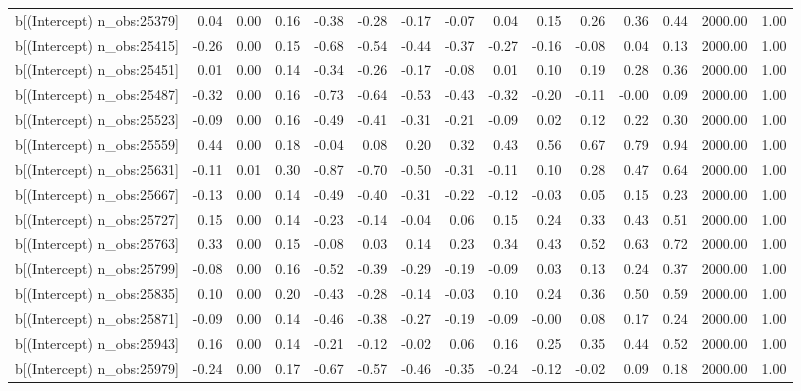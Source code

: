 \begin{table}[ht]
\begin{tabular}{rrrrrrrrrrrrrrr}
  b[(Intercept) n\_obs:25379] & 0.04 & 0.00 & 0.16 & -0.38 & -0.28 & -0.17 & -0.07 & 0.04 & 0.15 & 0.26 & 0.36 & 0.44 & 2000.00 & 1.00 \\ 
  b[(Intercept) n\_obs:25415] & -0.26 & 0.00 & 0.15 & -0.68 & -0.54 & -0.44 & -0.37 & -0.27 & -0.16 & -0.08 & 0.04 & 0.13 & 2000.00 & 1.00 \\ 
  b[(Intercept) n\_obs:25451] & 0.01 & 0.00 & 0.14 & -0.34 & -0.26 & -0.17 & -0.08 & 0.01 & 0.10 & 0.19 & 0.28 & 0.36 & 2000.00 & 1.00 \\ 
  b[(Intercept) n\_obs:25487] & -0.32 & 0.00 & 0.16 & -0.73 & -0.64 & -0.53 & -0.43 & -0.32 & -0.20 & -0.11 & -0.00 & 0.09 & 2000.00 & 1.00 \\ 
  b[(Intercept) n\_obs:25523] & -0.09 & 0.00 & 0.16 & -0.49 & -0.41 & -0.31 & -0.21 & -0.09 & 0.02 & 0.12 & 0.22 & 0.30 & 2000.00 & 1.00 \\ 
  b[(Intercept) n\_obs:25559] & 0.44 & 0.00 & 0.18 & -0.04 & 0.08 & 0.20 & 0.32 & 0.43 & 0.56 & 0.67 & 0.79 & 0.94 & 2000.00 & 1.00 \\ 
  b[(Intercept) n\_obs:25631] & -0.11 & 0.01 & 0.30 & -0.87 & -0.70 & -0.50 & -0.31 & -0.11 & 0.10 & 0.28 & 0.47 & 0.64 & 2000.00 & 1.00 \\ 
  b[(Intercept) n\_obs:25667] & -0.13 & 0.00 & 0.14 & -0.49 & -0.40 & -0.31 & -0.22 & -0.12 & -0.03 & 0.05 & 0.15 & 0.23 & 2000.00 & 1.00 \\ 
  b[(Intercept) n\_obs:25727] & 0.15 & 0.00 & 0.14 & -0.23 & -0.14 & -0.04 & 0.06 & 0.15 & 0.24 & 0.33 & 0.43 & 0.51 & 2000.00 & 1.00 \\ 
  b[(Intercept) n\_obs:25763] & 0.33 & 0.00 & 0.15 & -0.08 & 0.03 & 0.14 & 0.23 & 0.34 & 0.43 & 0.52 & 0.63 & 0.72 & 2000.00 & 1.00 \\ 
  b[(Intercept) n\_obs:25799] & -0.08 & 0.00 & 0.16 & -0.52 & -0.39 & -0.29 & -0.19 & -0.09 & 0.03 & 0.13 & 0.24 & 0.37 & 2000.00 & 1.00 \\ 
  b[(Intercept) n\_obs:25835] & 0.10 & 0.00 & 0.20 & -0.43 & -0.28 & -0.14 & -0.03 & 0.10 & 0.24 & 0.36 & 0.50 & 0.59 & 2000.00 & 1.00 \\ 
  b[(Intercept) n\_obs:25871] & -0.09 & 0.00 & 0.14 & -0.46 & -0.38 & -0.27 & -0.19 & -0.09 & -0.00 & 0.08 & 0.17 & 0.24 & 2000.00 & 1.00 \\ 
  b[(Intercept) n\_obs:25943] & 0.16 & 0.00 & 0.14 & -0.21 & -0.12 & -0.02 & 0.06 & 0.16 & 0.25 & 0.35 & 0.44 & 0.52 & 2000.00 & 1.00 \\ 
  b[(Intercept) n\_obs:25979] & -0.24 & 0.00 & 0.17 & -0.67 & -0.57 & -0.46 & -0.35 & -0.24 & -0.12 & -0.02 & 0.09 & 0.18 & 2000.00 & 1.00 \\ 

\end{tabular}
\end{table}
